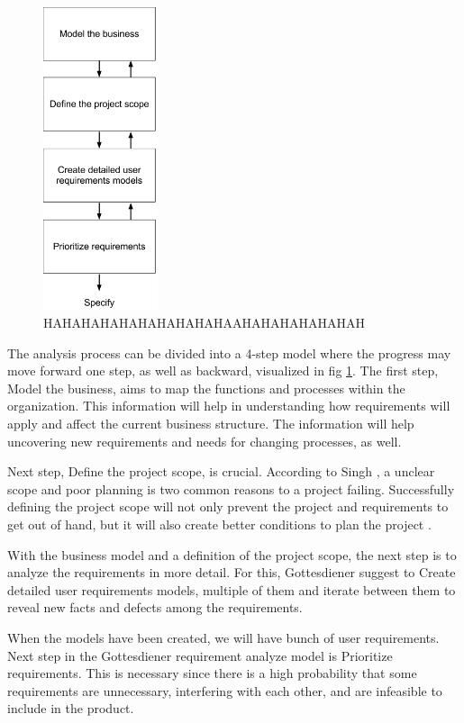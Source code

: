 \documentclass[a4paper]{article}
\begin{document}
\begin{figure}[!ht]
	\centering
		\includegraphics[width=0.3\textwidth]{images/analysis_model.png}
	\caption{HAHAHAHAHAHAHAHAHAHAAHAHAHAHAHAHAH}
	\label{figure:analysis}
\end{figure}

The analysis process can be divided into a 4-step model where the progress may move forward one step, as well as backward, visualized in fig \ref{figure:analysis}\cite{gott111}. The first step, Model the business, aims to map the functions and processes within the organization. This information will help in understanding how requirements will apply and affect the current business structure. The information will help uncovering new requirements and needs for changing processes, as well.
 
Next step, Define the project scope, is crucial. According to Singh \cite{projectsmart}, a unclear scope and poor planning is two common reasons to a project failing. Successfully defining the project scope will not only prevent the project and requirements to get out of hand, but it will also create better conditions to plan the project \cite{gott127}. 

With the business model and a definition of the project scope, the next step is to analyze the requirements in more detail. For this, Gottesdiener suggest to Create detailed user requirements models, multiple of them and iterate between them to reveal new facts and defects among the requirements.
        
When the models have been created, we will have bunch of user requirements. Next step in the Gottesdiener requirement analyze model is Prioritize requirements. This is necessary since there is a high probability that some requirements are unnecessary, interfering with each other, and are infeasible to include in the product\cite{Lecture 5}.  
\end{document}
